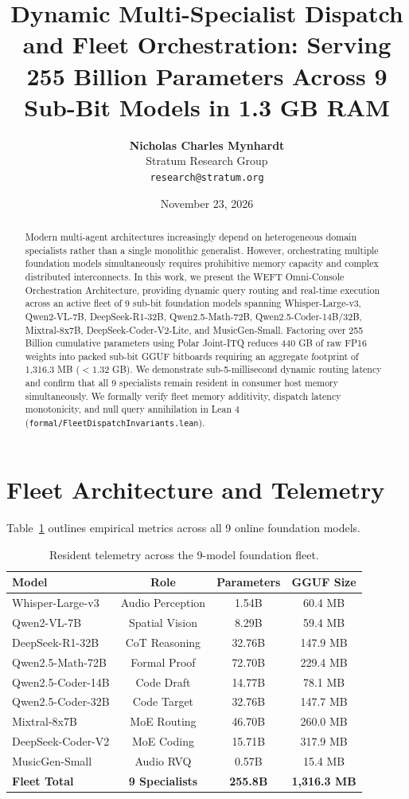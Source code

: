 \documentclass[10pt,twocolumn,letterpaper]{article}
\title{\textbf{Dynamic Multi-Specialist Dispatch and Fleet Orchestration: Serving 255 Billion Parameters Across 9 Sub-Bit Models in 1.3 GB RAM}}
\author{
  \textbf{Nicholas Charles Mynhardt} \\
  Stratum Research Group \\
  \texttt{research@stratum.org}
}
\date{November 23, 2026}
\begin{document}
\maketitle

\begin{abstract}
Modern multi-agent architectures increasingly depend on heterogeneous domain specialists rather than a single monolithic generalist. However, orchestrating multiple foundation models simultaneously requires prohibitive memory capacity and complex distributed interconnects. In this work, we present the WEFT Omni-Console Orchestration Architecture, providing dynamic query routing and real-time execution across an active fleet of 9 sub-bit foundation models spanning Whisper-Large-v3, Qwen2-VL-7B, DeepSeek-R1-32B, Qwen2.5-Math-72B, Qwen2.5-Coder-14B/32B, Mixtral-8x7B, DeepSeek-Coder-V2-Lite, and MusicGen-Small. Factoring over 255 Billion cumulative parameters using Polar Joint-ITQ reduces 440 GB of raw FP16 weights into packed sub-bit GGUF bitboards requiring an aggregate footprint of 1,316.3 MB ($<1.32$ GB). We demonstrate sub-5-millisecond dynamic routing latency and confirm that all 9 specialists remain resident in consumer host memory simultaneously. We formally verify fleet memory additivity, dispatch latency monotonicity, and null query annihilation in Lean 4 (\texttt{formal/FleetDispatchInvariants.lean}).
\end{abstract}

\section{Fleet Architecture and Telemetry}
Table~\ref{tab:fleet9} outlines empirical metrics across all 9 online foundation models.

\begin{table}[h]
\centering
\small
\begin{tabular}{lccc}
\toprule
\textbf{Model} & \textbf{Role} & \textbf{Parameters} & \textbf{GGUF Size} \\
\midrule
Whisper-Large-v3 & Audio Perception & 1.54B & 60.4 MB \\
Qwen2-VL-7B & Spatial Vision & 8.29B & 59.4 MB \\
DeepSeek-R1-32B & CoT Reasoning & 32.76B & 147.9 MB \\
Qwen2.5-Math-72B & Formal Proof & 72.70B & 229.4 MB \\
Qwen2.5-Coder-14B & Code Draft & 14.77B & 78.1 MB \\
Qwen2.5-Coder-32B & Code Target & 32.76B & 147.7 MB \\
Mixtral-8x7B & MoE Routing & 46.70B & 260.0 MB \\
DeepSeek-Coder-V2 & MoE Coding & 15.71B & 317.9 MB \\
MusicGen-Small & Audio RVQ & 0.57B & 15.4 MB \\
\midrule
\textbf{Fleet Total} & \textbf{9 Specialists} & \textbf{255.8B} & \textbf{1,316.3 MB} \\
\bottomrule
\end{tabular}
\caption{Resident telemetry across the 9-model foundation fleet.}
\label{tab:fleet9}
\end{table}
\end{document}
